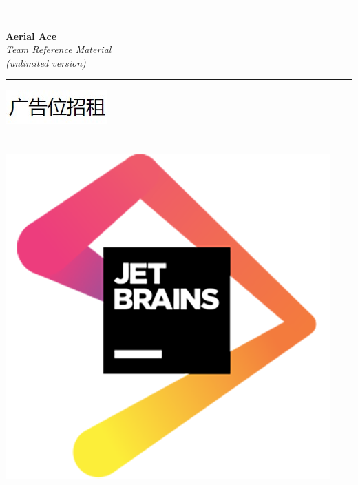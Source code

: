 \documentclass[titlepage, openany]{book}
\begin{document}
    \begin{titlepage}
        \centering
        \rule{\linewidth}{0.5mm}\\[0.4cm]
        {\Huge\bfseries Aerial Ace}\\[\baselineskip]
        {\textit {\Large Team Reference Material}}\\
        {\textit {\small (unlimited version)}}\\[0.4cm]
        \rule{\linewidth}{0.5mm}
        \vfill
        \includegraphics[scale=3]{pictures/aerial-ace.jpg}
        \vfill
        \\[0.1cm]
        \\[0.1cm]
        \\[0.4cm]
        \includegraphics[scale=0.4]{pictures/jetbrains.png}

\end{titlepage}
\end{document}
